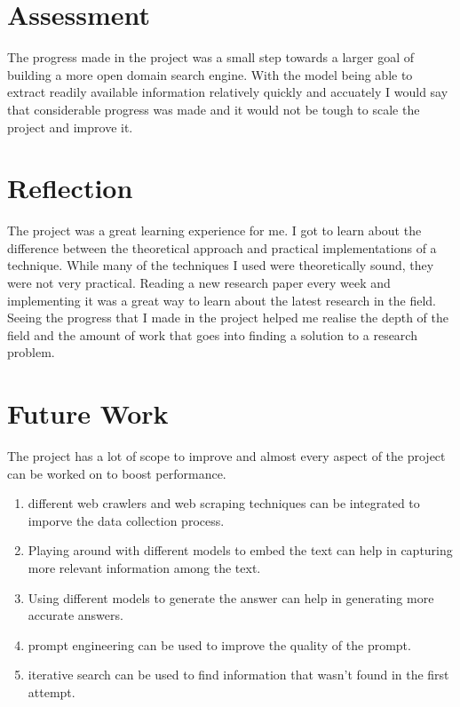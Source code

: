 \documentclass{article}
\begin{document}
\section{Assessment}

The progress made in the project was a small step towards a larger goal of building a more open domain search engine. With the model being able to extract readily available information relatively quickly and accuately I would say that considerable progress was made and it would not be tough to scale the project and improve it.

\section{Reflection}

The project was a great learning experience for me. I got to learn about the difference between the theoretical approach and practical implementations of a technique. While many of the techniques I used were theoretically sound, they were not very practical. Reading a new research paper every week and implementing it was a great way to learn about the latest research in the field. Seeing the progress that I made in the project helped me realise the depth of the field and the amount of work that goes into finding a solution to a research problem.

\section{Future Work}

The project has a lot of scope to improve and almost every aspect of the project can be worked on to boost performance.

\begin{enumerate}
    \item different web crawlers and web scraping techniques can be integrated to imporve the data collection process.
    \item Playing around with different models to embed the text can help in capturing more relevant information among the text.
    \item Using different models to generate the answer can help in generating more accurate answers.
    \item prompt engineering can be used to improve the quality of the prompt.
    \item iterative search can be used to find information that wasn't found in the first attempt.
\end{enumerate}
\end{document}
